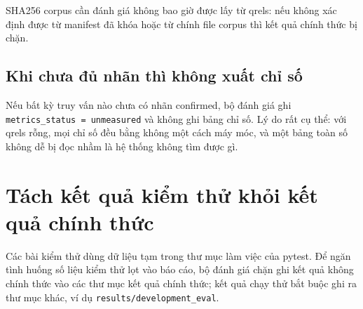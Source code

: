 SHA256 corpus cần đánh giá không bao giờ được lấy từ qrels: nếu không xác định
được từ manifest đã khóa hoặc từ chính file corpus thì kết quả chính thức bị chặn.

\subsection{Khi chưa đủ nhãn thì không xuất chỉ số}

Nếu bất kỳ truy vấn nào chưa có nhãn confirmed, bộ đánh giá ghi
\texttt{metrics\_status = unmeasured} và không ghi bảng chỉ số. Lý do rất cụ thể:
với qrels rỗng, mọi chỉ số đều bằng không một cách máy móc, và một bảng toàn số
không dễ bị đọc nhầm là hệ thống không tìm được gì.

\section{Tách kết quả kiểm thử khỏi kết quả chính thức}

Các bài kiểm thử dùng dữ liệu tạm trong thư mục làm việc của pytest. Để ngăn
tình huống số liệu kiểm thử lọt vào báo cáo, bộ đánh giá chặn ghi kết quả không
chính thức vào các thư mục kết quả chính thức; kết quả chạy thử bắt buộc ghi ra
thư mục khác, ví dụ \texttt{results/development\_eval}.
